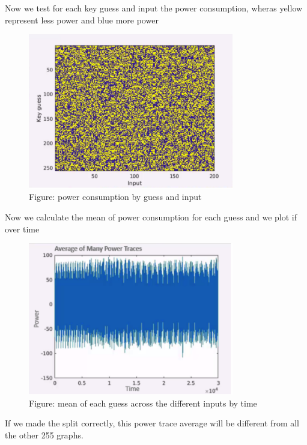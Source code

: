 Now we test for each key guess and input the power consumption, wheras yellow represent less power and blue more power
\begin{figure}[H]
\centering
\includegraphics[width=0.8\textwidth]{images/Lecture6/intensity_by_guess.png}
\caption{Figure: power consumption by guess and input}
\label{fig:DPA_Illustration}
\end{figure}
Now we calculate the mean of power consumption for each guess and we plot if over time
\begin{figure}[H]
\centering
\includegraphics[width=0.8\textwidth]{images/Lecture6/avg_of_many_traces.png}
\caption{Figure: mean of each guess across the different inputs by time}
\label{fig:DPA_Illustration}
\end{figure}
If we made the split correctly, this power trace average will be different from all the other 255 graphs.

